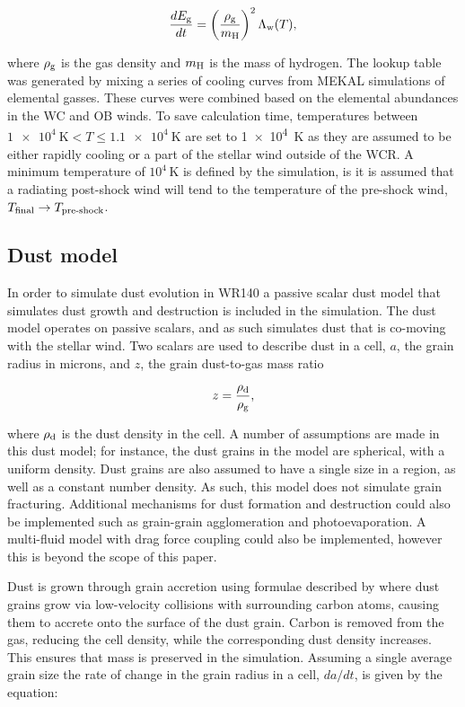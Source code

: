 \begin{equation}
  \frac{dE_\text{g}}{dt} = \left(\frac{\rho_\text{g}}{m_\text{H}}\right)^2 \Lambda_\text{w}(T),
\end{equation}

\noindent
where $\rho_\text{g}$ is the gas density and $m_\text{H}$ is the mass of hydrogen.
The lookup table was generated by mixing a series of cooling curves from MEKAL simulations of elemental gasses.
These curves were combined based on the elemental abundances in the WC and OB winds.
To save calculation time, temperatures between $\SI{1e4}{\kelvin} < T \leq \SI{1.1e4}{\kelvin}$ are set to \SI{1e4}{\kelvin} as they are assumed to be either rapidly cooling or a part of the stellar wind outside of the WCR.
A minimum temperature of $10^4\, \si{\kelvin}$ is defined by the simulation, is it is assumed that a radiating post-shock wind will tend to the temperature of the pre-shock wind, $T_\text{final} \rightarrow T_\text{pre-shock}$.

\subsection{Dust model}
\label{sec:dust-model}

In order to simulate dust evolution in WR140 a passive scalar dust model that simulates dust growth and destruction is included in the simulation.
The dust model operates on passive scalars, and as such simulates dust that is co-moving with the stellar wind.
Two scalars are used to describe dust in a cell, $a$, the grain radius in microns, and $z$, the grain dust-to-gas mass ratio

\begin{equation}
  z = \frac{\rho_\text{d}}{\rho_\text{g}},
\end{equation}

\noindent
where $\rho_\text{d}$ is the dust density in the cell.
A number of assumptions are made in this dust model; for instance, the dust grains in the model are spherical, with a uniform density.
Dust grains are also assumed to have a single size in a region, as well as a constant number density.
As such, this model does not simulate grain fracturing.
Additional mechanisms for dust formation and destruction could also be implemented such as grain-grain agglomeration and photoevaporation.
A multi-fluid model with drag force coupling could also be implemented, however this is beyond the scope of this paper.

Dust is grown through grain accretion using formulae described by \parencite{spitzerPhysicalProcessesInterstellar2008} where dust grains grow via low-velocity collisions with surrounding carbon atoms, causing them to accrete onto the surface of the dust grain.
Carbon is removed from the gas, reducing the cell density, while the corresponding dust density increases.
This ensures that mass is preserved in the simulation.
Assuming a single average grain size the rate of change in the grain radius in a cell, $da/dt$, is given by the equation:

